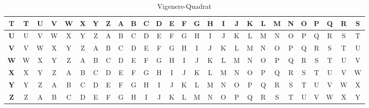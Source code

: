 \begin{table}[H]
\begin{tabular}{|c||c|c|c|c|c|c|c|c|c|c|c|c|c|c|c|c|c|c|c|c|c|c|c|c|c|c|}
							\textbf{T} & T          & U          & V          & W          & X          & Y          & Z          & A          & B          & C          & D          & E          & F          & G          & H          & I          & J          & K          & L          & M          & N          & O          & P          & Q          & R          & S          \\ \hline
							\textbf{U} & U          & V          & W          & X          & Y          & Z          & A          & B          & C          & D          & E          & F          & G          & H          & I          & J          & K          & L          & M          & N          & O          & P          & Q          & R          & S          & T          \\ \hline
							\textbf{V} & V          & W          & X          & Y          & Z          & A          & B          & C          & D          & E          & F          & G          & H          & I          & J          & K          & L          & M          & N          & O          & P          & Q          & R          & S          & T          & U          \\ \hline
							\textbf{W} & W          & X          & Y          & Z          & A          & B          & C          & D          & E          & F          & G          & H          & I          & J          & K          & L          & M          & N          & O          & P          & Q          & R          & S          & T          & U          & V          \\ \hline
							\textbf{X} & X          & Y          & Z          & A          & B          & C          & D          & E          & F          & G          & H          & I          & J          & K          & L          & M          & N          & O          & P          & Q          & R          & S          & T          & U          & V          & W          \\ \hline
							\textbf{Y} & Y          & Z          & A          & B          & C          & D          & E          & F          & G          & H          & I          & J          & K          & L          & M          & N          & O          & P          & Q          & R          & S          & T          & U          & V          & W          & X          \\ \hline
							\textbf{Z} & Z          & A          & B          & C          & D          & E          & F          & G          & H          & I          & J          & K          & L          & M          & N          & O          & P          & Q          & R          & S          & T          & U          & V          & W          & X          & Y          \\ \hline
						\end{tabular}
						\caption{Vigenere-Quadrat}
					\end{table}


